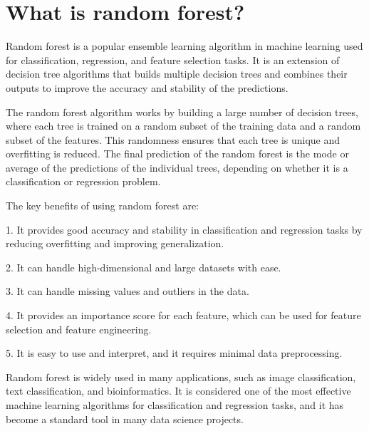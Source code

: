 \section{What is random forest?}
Random forest is a popular ensemble learning algorithm in machine learning used for classification, regression, and feature selection tasks. It is an extension of decision tree algorithms that builds multiple decision trees and combines their outputs to improve the accuracy and stability of the predictions.

The random forest algorithm works by building a large number of decision trees, where each tree is trained on a random subset of the training data and a random subset of the features. This randomness ensures that each tree is unique and overfitting is reduced. The final prediction of the random forest is the mode or average of the predictions of the individual trees, depending on whether it is a classification or regression problem.

The key benefits of using random forest are:

1. It provides good accuracy and stability in classification and regression tasks by reducing overfitting and improving generalization.

2. It can handle high-dimensional and large datasets with ease.

3. It can handle missing values and outliers in the data.

4. It provides an importance score for each feature, which can be used for feature selection and feature engineering.

5. It is easy to use and interpret, and it requires minimal data preprocessing.

Random forest is widely used in many applications, such as image classification, text classification, and bioinformatics. It is considered one of the most effective machine learning algorithms for classification and regression tasks, and it has become a standard tool in many data science projects.

